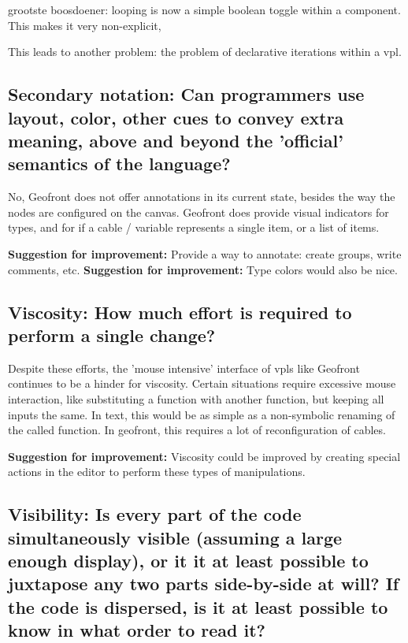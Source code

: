 grootste boosdoener: looping is now a simple boolean toggle within a component. 
This makes it very non-explicit, 

This leads to another problem: the problem of declarative iterations within a vpl. 


\subsection*{Secondary notation: Can programmers use layout, color, other cues to convey extra meaning, above and beyond the 'official' semantics of the language?}

No, Geofront does not offer annotations in its current state, besides the way the nodes are configured on the canvas.  
Geofront does provide visual indicators for types, and for if a cable / variable represents a single item, or a list of items.

\textbf{Suggestion for improvement:} Provide a way to annotate: create groups, write comments, etc. 
\textbf{Suggestion for improvement:} Type colors would also be nice.

\subsection*{Viscosity: How much effort is required to perform a single change?}

Despite these efforts, the 'mouse intensive' interface of vpls like Geofront continues to be a hinder for viscosity.
Certain situations require excessive mouse interaction, like substituting a function with another function, but keeping all inputs the same.
In text, this would be as simple as a non-symbolic renaming of the called function.
In geofront, this requires a lot of reconfiguration of cables. 

\textbf{Suggestion for improvement:} Viscosity could be improved by creating special actions in the editor to perform these types of manipulations.  


\subsection*{Visibility: Is every part of the code simultaneously visible (assuming a large enough display), or it it at least possible to juxtapose any two parts side-by-side at will? If the code is dispersed, is it at least possible to know in what order to read it?}

